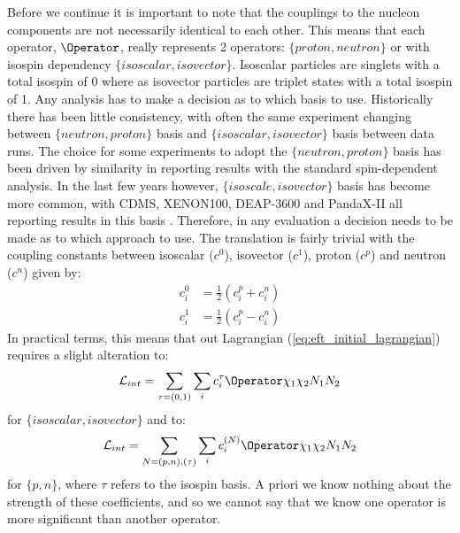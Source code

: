 \par
Before we continue it is important to note that the couplings to the nucleon components are not necessarily identical to each other.
This means that each operator, $\Operator$, really represents 2 operators: $\{proton,neutron\}$ or with isospin dependency $\{isoscalar,isovector\}$.
Isoscalar particles are singlets with a total isospin of 0 where as isovector particles are triplet states with a total isospin of 1.
Any analysis has to make a decision as to which basis to use.
Historically there has been little consistency, with often the same experiment changing between $\{neutron, proton\}$ basis and $\{isoscalar, isovector\}$ basis between data runs.
The choice for some experiments to adopt the $\{neutron, proton\}$ basis has been driven by similarity in reporting results with the standard spin-dependent analysis.
In the last few years however, $\{isoscale, isovector\}$ basis has become more common, with CDMS, XENON100, DEAP-3600 and PandaX-II all reporting results in this basis \cite{cdms_eft_ref,xenon100_eft_ref,deap3600_eft_ref,pandax_2_eft_ref}.
Therefore, in any evaluation a decision needs to be made as to which approach to use.
The translation is fairly trivial with the coupling constants between isoscalar ($c^0$), isovector ($c^1$), proton ($c^p$) and neutron ($c^n$) given by:
\begin{equation}
\begin{split}
    c_i^0 &= \frac{1}{2}(c_i^p + c_i^n)  \\
    c_i^1 &= \frac{1}{2}(c_i^p - c_i^n) 
\end{split}
\label{eq:eft_iso_to_pn}
\end{equation}
In practical terms, this means that out Lagrangian (\autoref{eq:eft_initial_lagrangian}) requires a slight alteration to:
\begin{equation}
    \mathcal{L}_{int}  = \sum_{\tau = (0,1)} \sum_{i}c^{\tau}_{i} \Operator \chi_1 \chi_2 N_1 N_2
\end{equation}
for $\{isoscalar,isovector\}$ and to:
\begin{equation}
    \mathcal{L}_{int} = \sum_{N = (p,n),(\tau)} \sum_{i}c^{(N)}_{i} \Operator \chi_1 \chi_2 N_1 N_2
\end{equation}
for $\{p,n\}$, where $\tau$ refers to the isospin basis.
A priori we know nothing about the strength of these coefficients, and so we cannot say that we know one operator is more significant than another operator.

